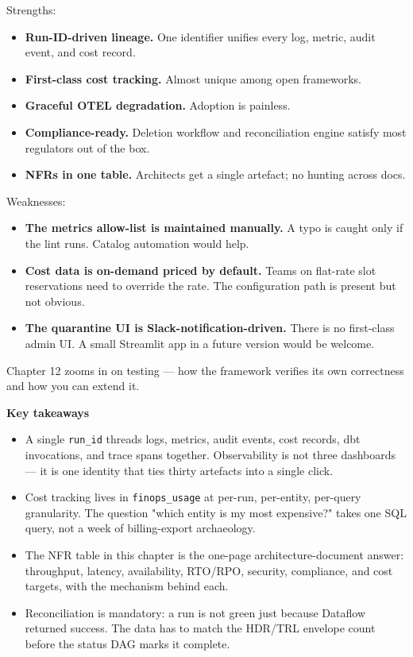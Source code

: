 \documentclass[
  11pt,
  british,
  oneside]{book}
\providecommand{\tightlist}{%
  \setlength{\itemsep}{0pt}\setlength{\parskip}{0pt}}
\begin{document}
Strengths:

\begin{itemize}
\tightlist
\item
  \textbf{Run-ID-driven lineage.} One identifier unifies every log,
  metric, audit event, and cost record.
\item
  \textbf{First-class cost tracking.} Almost unique among open
  frameworks.
\item
  \textbf{Graceful OTEL degradation.} Adoption is painless.
\item
  \textbf{Compliance-ready.} Deletion workflow and reconciliation engine
  satisfy most regulators out of the box.
\item
  \textbf{NFRs in one table.} Architects get a single artefact; no
  hunting across docs.
\end{itemize}

Weaknesses:

\begin{itemize}
\tightlist
\item
  \textbf{The metrics allow-list is maintained manually.} A typo is
  caught only if the lint runs. Catalog automation would help.
\item
  \textbf{Cost data is on-demand priced by default.} Teams on flat-rate
  slot reservations need to override the rate. The configuration path is
  present but not obvious.
\item
  \textbf{The quarantine UI is Slack-notification-driven.} There is no
  first-class admin UI. A small Streamlit app in a future version would
  be welcome.
\end{itemize}

Chapter 12 zooms in on testing --- how the framework verifies its own
correctness and how you can extend it.

\begin{takeaways}
\textbf{Key takeaways}
\begin{itemize}
  \item A single \texttt{run\_id} threads logs, metrics, audit events, cost records, dbt invocations, and trace spans together. Observability is not three dashboards — it is one identity that ties thirty artefacts into a single click.
  \item Cost tracking lives in \texttt{finops\_usage} at per-run, per-entity, per-query granularity. The question "which entity is my most expensive?" takes one SQL query, not a week of billing-export archaeology.
  \item The NFR table in this chapter is the one-page architecture-document answer: throughput, latency, availability, RTO/RPO, security, compliance, and cost targets, with the mechanism behind each.
  \item Reconciliation is mandatory: a run is not green just because Dataflow returned success. The data has to match the HDR/TRL envelope count before the status DAG marks it complete.
\end{itemize}
\end{takeaways}
\end{document}
